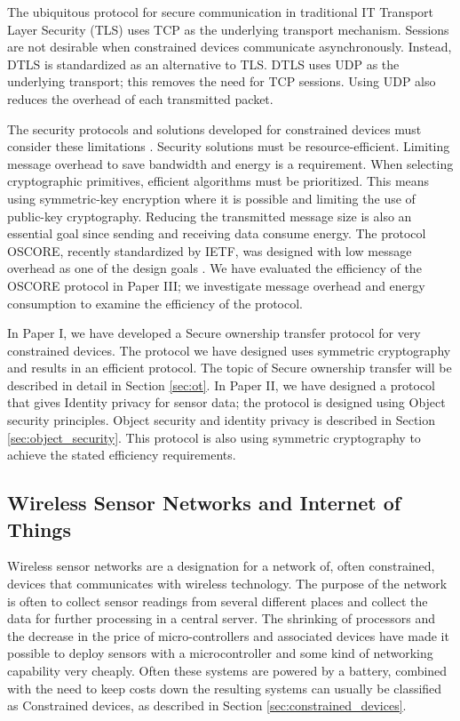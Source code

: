 The ubiquitous protocol for secure communication in traditional IT Transport Layer Security (TLS) \cite{RFC8446} uses TCP as the underlying transport mechanism. Sessions are not desirable when constrained devices communicate asynchronously. Instead, DTLS is standardized as an alternative to TLS. DTLS uses UDP as the underlying transport; this removes the need for TCP sessions. Using UDP also reduces the overhead of each transmitted packet.

The security protocols and solutions developed for constrained devices must consider these limitations \cite{I-D.irtf-t2trg-iot-seccons}. Security solutions must be resource-efficient. Limiting message overhead to save bandwidth and energy is a requirement. When selecting cryptographic primitives, efficient algorithms must be prioritized. This means using symmetric-key encryption where it is possible and limiting the use of public-key cryptography. Reducing the transmitted message size is also an essential goal since sending and receiving data consume energy. The protocol OSCORE, recently standardized by IETF, was designed with low message overhead as one of the design goals \cite{RFC8613}. We have evaluated the efficiency of the OSCORE protocol in Paper III; we investigate message overhead and energy consumption to examine the efficiency of the protocol. 

In Paper I, we have developed a Secure ownership transfer protocol for very constrained devices. The protocol we have designed uses symmetric cryptography and results in an efficient protocol. The topic of Secure ownership transfer will be described in detail in Section \ref{sec:ot}. In Paper II, we have designed a protocol that gives Identity privacy for sensor data; the protocol is designed using Object security principles. Object security and identity privacy is described in Section \ref{sec:object_security}. This protocol is also using symmetric cryptography to achieve the stated efficiency requirements. 

\subsection{Wireless Sensor Networks and Internet of Things}
\label{subsec:wsn_iot}
Wireless sensor networks are a designation for a network of, often constrained, devices that communicates with wireless technology. The purpose of the network is often to collect sensor readings from several different places and collect the data for further processing in a central server. 
The shrinking of processors and the decrease in the price of micro-controllers and associated devices have made it possible to deploy sensors with a microcontroller and some kind of networking capability very cheaply. Often these systems are powered by a battery, combined with the need to keep costs down the resulting systems can usually be classified as Constrained devices, as described in Section \ref{sec:constrained_devices}. 


